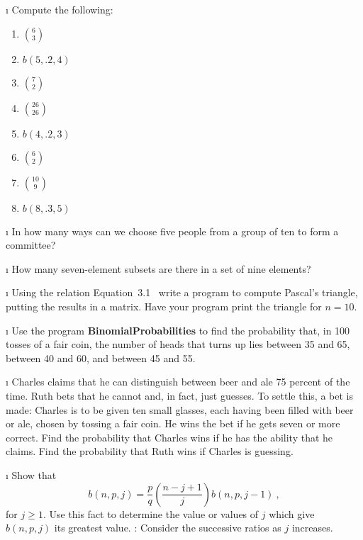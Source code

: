 \exercises
\begin{LJSItem}

\i\label{exer 3.2.1} Compute the following:
\begin{enumerate}
\item ${6 \choose 3}$

\item $b(5,.2,4)$

\item ${7 \choose 2}$

\item ${{26} \choose {26}}$

\item $b(4,.2,3)$

\item ${6 \choose 2}$

\item ${{10} \choose 9}$

\item $b(8, .3, 5)$
\end{enumerate}

\i\label{exer 3.2.2} In how many ways can we choose five people from a group of ten
to form a committee?

\i\label{exer 3.2.3} How many seven-element subsets are there in a set of nine
elements?

\i\label{exer 3.2.4} Using the relation Equation~3.1~            
write a program to compute Pascal's triangle, putting the results in a matrix.   Have
your program print the triangle for $n = 10$.

\i\label{exer 3.2.5} Use the program {\bf BinomialProbabilities} to find the probability that,
in 100 tosses of a fair coin, the number of heads that turns up lies between 35 and 65,
between 40 and 60, and between 45 and 55.

\i\label{exer 3.2.6} Charles claims that he can distinguish between
beer and ale 75 percent of the time.  Ruth bets that he cannot and, in fact, just
guesses.  To settle this, a bet is made: Charles is to be given ten small glasses,
each having been filled with beer or ale, chosen by tossing a fair coin.  He wins the
bet if he gets seven or more correct.  Find the probability that Charles wins if he
has the ability that he claims.  Find the probability that Ruth wins if Charles is
guessing.

\i\label{exer 3.2.7} Show that
$$ b(n,p,j) = \frac pq \left(\frac {n - j + 1}j \right) b(n,p,j - 1)\ ,
$$ for $j \ge 1$. Use this fact to determine the value or values of $j$ which give
$b(n,p,j)$ its greatest value.  : Consider the successive ratios as $j$
increases.


\end{LJSItem}
